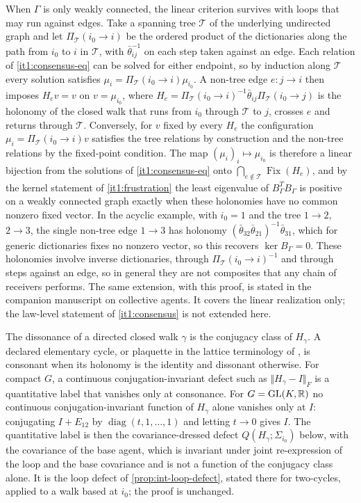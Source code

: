 When $\Gamma$ is only weakly connected, the linear criterion survives with loops that may run against edges. Take a spanning tree $\mathcal T$ of the underlying undirected graph and let $\Pi_{\mathcal T}(i_0\to i)$ be the ordered product of the dictionaries along the path from $i_0$ to $i$ in $\mathcal T$, with $\bar\theta_{ij}^{-1}$ on each step taken against an edge. Each relation of \cref{it1:consensus-eq} can be solved for either endpoint, so by induction along $\mathcal T$ every solution satisfies $\mu_i=\Pi_{\mathcal T}(i_0\to i)\mu_{i_0}$. A non-tree edge $e:j\to i$ then imposes $H_ev=v$ on $v=\mu_{i_0}$, where $H_e=\Pi_{\mathcal T}(i_0\to i)^{-1}\bar\theta_{ij}\Pi_{\mathcal T}(i_0\to j)$ is the holonomy of the closed walk that runs from $i_0$ through $\mathcal T$ to $j$, crosses $e$ and returns through $\mathcal T$. Conversely, for $v$ fixed by every $H_e$ the configuration $\mu_i=\Pi_{\mathcal T}(i_0\to i)v$ satisfies the tree relations by construction and the non-tree relations by the fixed-point condition. The map $(\mu_i)_i\mapsto\mu_{i_0}$ is therefore a linear bijection from the solutions of \cref{it1:consensus-eq} onto $\bigcap_{e\notin\mathcal T}\operatorname{Fix}(H_e)$, and by the kernel statement of \cref{it1:frustration} the least eigenvalue of $B_\Gamma^TB_\Gamma$ is positive on a weakly connected graph exactly when these holonomies have no common nonzero fixed vector. In the acyclic example, with $i_0=1$ and the tree $1\to2$, $2\to3$, the single non-tree edge $1\to3$ has holonomy $(\bar\theta_{32}\bar\theta_{21})^{-1}\bar\theta_{31}$, which for generic dictionaries fixes no nonzero vector, so this recovers $\ker B_\Gamma=0$. These holonomies involve inverse dictionaries, through $\Pi_{\mathcal T}(i_0\to i)^{-1}$ and through steps against an edge, so in general they are not composites that any chain of receivers performs. The same extension, with this proof, is stated in the companion manuscript on collective agents. It covers the linear realization only; the law-level statement of \cref{it1:consensus} is not extended here.

The dissonance of a directed closed walk $\gamma$ is the conjugacy class of $H_\gamma$. A declared elementary cycle, or plaquette in the lattice terminology of \citet{Wilson1974}, is consonant when its holonomy is the identity and dissonant otherwise. For compact $G$, a continuous conjugation-invariant defect such as $\Vert H_\gamma-I\Vert_F$ is a quantitative label that vanishes only at consonance. For $G=\mathrm{GL}(K,\mathbb R)$ no continuous conjugation-invariant function of $H_\gamma$ alone vanishes only at $I$: conjugating $I+E_{12}$ by $\operatorname{diag}(t,1,\ldots,1)$ and letting $t\to0$ gives $I$. The quantitative label is then the covariance-dressed defect $Q(H_\gamma;\Sigma_{i_0})$ below, with the covariance of the base agent, which is invariant under joint re-expression of the loop and the base covariance and is not a function of the conjugacy class alone. It is the loop defect of \cref{prop:int-loop-defect}, stated there for two-cycles, applied to a walk based at $i_0$; the proof is unchanged.

